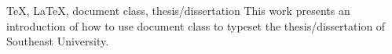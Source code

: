 \documentclass[figurelist,tablelist,algorithmlist,nomlist,masters]{Style/seuthesix}
\begin{document}

\begin{abstract}{\TeX, \LaTeX, 文档类， 学位论文}
本文介绍如何使用\seuthesix 文档类撰写东南大学学位论文。
\end{abstract}
\begin{englishabstract}{\TeX, \LaTeX, document class, thesis/dissertation}
This work presents an introduction of how to use \seuthesix document class to 
typeset the thesis/dissertation of Southeast University.
\end{englishabstract}

\tableofcontents
\listofothers

\mainmatter






 
       
\end{document}
